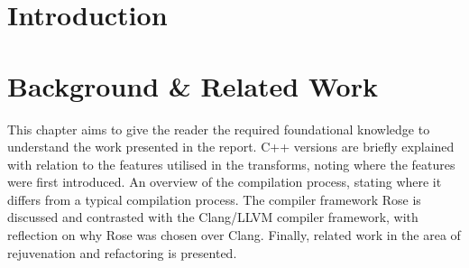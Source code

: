 \documentclass[bsc,frontabs,singlespacing,parskip,deptreport]{infthesis}
\begin{document}
\chapter{Introduction} \label{Introduction}%





\chapter{Background \& Related Work}
This chapter aims to give the reader the required foundational knowledge to understand the work presented in the report. C++ versions are briefly explained with relation to the features utilised in the transforms, noting where the features were first introduced. An overview of the compilation process, stating where it differs from a typical compilation process.
The compiler framework Rose is discussed and contrasted with the Clang/LLVM compiler framework, with reflection on why Rose was chosen over Clang. Finally, related work in the area of rejuvenation and refactoring is presented.
\end{document}
